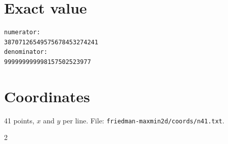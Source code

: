 \documentclass[11pt,a4paper]{article}
\begin{document}
\appendix
\section{Exact value}
{\small
\begin{verbatim}
numerator:
38707126549575678453274241
denominator:
999999999998157502523977
\end{verbatim}}

\section{Coordinates}
41 points, $x$ and $y$ per line. File: \texttt{friedman-maxmin2d/coords/n41.txt}.
{\tiny
\begin{multicols}{2}
\end{multicols}}
\end{document}
